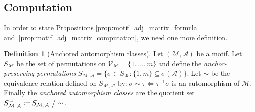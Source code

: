 \documentclass[12pt]{ociamthesis}
\theoremstyle{plain}
\theoremstyle{definition}
\newtheorem{definition}{Definition}[chapter]
\theoremstyle{remark}
\newcommand\ca[1]{\mathcal{#1}}
\begin{document}
\subsection{Computation} \label{sec:graphs_computation}

In order to state Propositions \ref{prop:motif_adj_matrix_formula}
and~\ref{prop:motif_adj_matrix_computation}, we need one more definition.

\begin{definition}[Anchored automorphism classes]
  Let $(\ca{M,A})$ be a motif.
  Let $S_\ca{M}$ be the set of permutations on $ \ca{V_M} = \{ 1, \ldots, m \}$
  and define the \emph{anchor-preserving permutations} $S_\ca{M,A} = \{ \sigma
  \in S_\ca{M} : \{1,m\} \subseteq \sigma(\ca{A}) \}$.
  Let $\sim$ be the equivalence relation defined on $S_\ca{M,A}$ by: $\sigma
  \sim \tau \iff \tau^{-1} \sigma$ is an automorphism of $\ca{M}$.
  Finally the \emph{anchored automorphism classes} are the quotient set
  $S_\ca{M,A}^\sim \vcentcolon= S_\ca{M,A} \ \big/ \sim$\,.
\end{definition}
\end{document}
